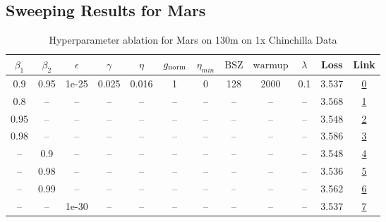 \subsection{Sweeping Results for Mars}%
\begin{table}[H]
\centering
\caption{Hyperparameter ablation for Mars on 130m on 1x Chinchilla Data}
\label{tab:ablation_mars_130m_on_1x_chinchilla_data}
\begin{tabular}{cccccccccccc}
\toprule
$\beta_1$ & $\beta_2$ & $\epsilon$ & $\gamma$ & $\eta$ & $g_{\mathrm{norm}}$ & $\eta_{min}$ & $\mathrm{BSZ}$ & $\mathrm{warmup}$ & $\lambda$ & Loss & Link \\
\midrule
0.9 & 0.95 & 1e-25 & 0.025 & 0.016 & 1 & 0 & 128 & 2000 & 0.1 & 3.537 & \href{https://wandb.ai/marin-community/optimizer-scaling/runs/sweep-130m-2B-mars692316lr0.016-wd0.1-minlr0-warmup2000-b10.9-b2-93e276}{0} \\
\midrule
0.8 & -- & -- & -- & -- & -- & -- & -- & -- & -- & 3.568 & \href{https://wandb.ai/marin-community/optimizer-scaling/runs/sweep-130m-2B-mars429f19lr0.016-wd0.1-minlr0-warmup2000-b10.8-b2-8e6b1f}{1} \\
0.95 & -- & -- & -- & -- & -- & -- & -- & -- & -- & 3.548 & \href{https://wandb.ai/marin-community/optimizer-scaling/runs/sweep-130m-2B-mars07f867lr0.016-wd0.1-minlr0-warmup2000-b10.95-b-1c9da8}{2} \\
0.98 & -- & -- & -- & -- & -- & -- & -- & -- & -- & 3.586 & \href{https://wandb.ai/marin-community/optimizer-scaling/runs/sweep-130m-2B-mars32fa0blr0.016-wd0.1-minlr0-warmup2000-b10.98-b-f2c1f5}{3} \\
-- & 0.9 & -- & -- & -- & -- & -- & -- & -- & -- & 3.548 & \href{https://wandb.ai/marin-community/optimizer-scaling/runs/sweep-130m-2B-mars2816c1lr0.016-wd0.1-minlr0-warmup2000-b10.9-b2-ea14d0}{4} \\
-- & 0.98 & -- & -- & -- & -- & -- & -- & -- & -- & 3.536 & \href{https://wandb.ai/marin-community/optimizer-scaling/runs/sweep-130m-2B-marse45e36lr0.016-wd0.1-minlr0-warmup2000-b10.9-b2-2de81b}{5} \\
-- & 0.99 & -- & -- & -- & -- & -- & -- & -- & -- & 3.562 & \href{https://wandb.ai/marin-community/optimizer-scaling/runs/sweep-130m-2B-mars2f8911lr0.016-wd0.1-minlr0-warmup2000-b10.9-b2-172044}{6} \\
-- & -- & 1e-30 & -- & -- & -- & -- & -- & -- & -- & 3.537 & \href{https://wandb.ai/marin-community/optimizer-scaling/runs/sweep-130m-2B-mars692316lr0.016-wd0.1-minlr0-warmup2000-b10.9-b2-93e276}{7} \\

\end{tabular}
\end{table}
